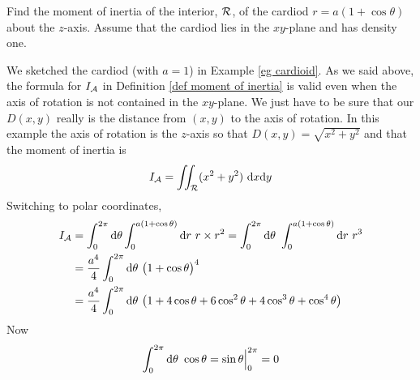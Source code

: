 \begin{eg}[Cardioid]\label{eg moment cardiod}
Find the moment of inertia of the interior, $\mathcal{R}$,
of the cardiod $r=a(1+\cos\theta)$ about the $z$-axis. 
Assume that the cardiod lies in the $xy$-plane and  has density one.

\soln We sketched the cardiod (with $a=1$) in Example \ref{eg cardioid}.
As we said above, the formula for $I_{\mathcal{A}}$ in Definition 
\ref{def moment of inertia} is valid even when the axis of 
rotation is not contained in the $xy$-plane. We just have to
be sure that our $D(x,y)$ really is the distance from $(x,y)$ to
the axis of rotation. In this example the axis of rotation is the
$z$-axis so that $D(x,y)=\sqrt{x^2+y^2}$ and that the moment of
inertia is 
\begin{equation*}
I_{\mathcal{A}} = \iint_{\mathcal{R}} (x^2+y^2)\ \mathrm{d}x\mathrm{d}y
\end{equation*}
Switching to polar coordinates,
\begin{align*}
I_\cA &= \int_0^{2\pi}\dee{\theta}\int_0^{a(1+\cos\theta)}\dee{r}\ r\times r^2
      = \int_0^{2\pi}\dee{\theta}\ \int_0^{a(1+\cos\theta)}\dee{r}\ r^3 \\
&=\frac{a^4}{4}\int_0^{2\pi}\dee{\theta}\
          \big(1+\cos\theta\big)^4  \\
&=\frac{a^4}{4}\int_0^{2\pi}\dee{\theta}\ 
          \big(1+4\cos\theta+6\cos^2\theta+4\cos^3\theta+\cos^4\theta\big) 
\end{align*}
Now
\begin{align*}
\int_0^{2\pi}\dee{\theta}\ \cos\theta
     &= \sin\theta\Big|_0^{2\pi}
     =0 \\

\end{align*}
\end{eg}
